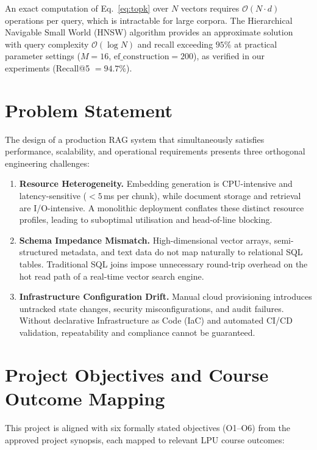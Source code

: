 \documentclass[12pt,a4paper]{report}
\begin{document}
An exact computation of Eq.~\eqref{eq:topk} over $N$ vectors requires
$\mathcal{O}(N \cdot d)$ operations per query, which is intractable for large
corpora. The Hierarchical Navigable Small World (HNSW) algorithm
\cite{malkov2018hnsw} provides an approximate solution with query complexity
$\mathcal{O}(\log N)$ and recall exceeding $95\%$ at practical parameter
settings ($M = 16$, $\text{ef\_construction} = 200$), as verified in our
experiments (Recall@5 $= 94.7\%$).

\section{Problem Statement}

The design of a production RAG system that simultaneously satisfies
performance, scalability, and operational requirements presents three
orthogonal engineering challenges:

\begin{enumerate}[label=\textbf{C\arabic*}., leftmargin=2cm]
  \item \textbf{Resource Heterogeneity.} Embedding generation is CPU-intensive
        and latency-sensitive ($<5$\,ms per chunk), while document storage and
        retrieval are I/O-intensive. A monolithic deployment conflates these
        distinct resource profiles, leading to suboptimal utilisation and
        head-of-line blocking.

  \item \textbf{Schema Impedance Mismatch.} High-dimensional vector arrays,
        semi-structured metadata, and text data do not map naturally to
        relational SQL tables. Traditional SQL joins impose unnecessary round-trip
        overhead on the hot read path of a real-time vector search engine.

  \item \textbf{Infrastructure Configuration Drift.} Manual cloud provisioning
        introduces untracked state changes, security misconfigurations, and
        audit failures. Without declarative Infrastructure as Code (IaC) and
        automated CI/CD validation, repeatability and compliance cannot be
        guaranteed.
\end{enumerate}

\section{Project Objectives and Course Outcome Mapping}

This project is aligned with six formally stated objectives (O1--O6) from the
approved project synopsis, each mapped to relevant LPU course outcomes:
\end{document}
